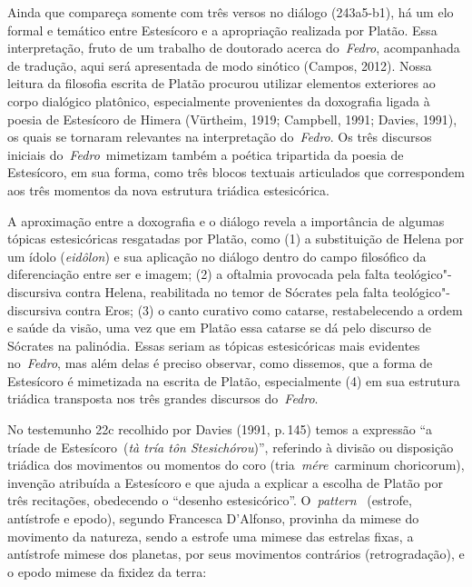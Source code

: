  

Ainda que compareça somente com três versos no diálogo (243a5-b1), há um
elo formal e temático entre Estesícoro e a apropriação realizada por
Platão. Essa interpretação, fruto de um trabalho de doutorado acerca
do~\emph{Fedro}, acompanhada de tradução, aqui será apresentada de modo
sinótico (Campos, 2012). Nossa leitura da filosofia escrita de Platão
procurou utilizar elementos exteriores ao corpo dialógico platônico,
especialmente provenientes da doxografia ligada à poesia de Estesícoro
de Himera (Vürtheim, 1919; Campbell, 1991; Davies, 1991), os quais se
tornaram relevantes na interpretação do~\emph{Fedro}. Os três discursos
iniciais do~\emph{Fedro}~mimetizam também a poética tripartida da poesia
de Estesícoro, em sua forma, como três blocos textuais articulados que
correspondem aos três momentos da nova estrutura triádica estesicórica.

A aproximação entre a doxografia e o diálogo revela a importância de
algumas tópicas estesicóricas resgatadas por Platão, como (1) a
substituição de Helena por um ídolo (\emph{eidôlon}) e sua aplicação no
diálogo dentro do campo filosófico da diferenciação entre ser e imagem; 
(2) a oftalmia provocada pela falta teológico"-discursiva contra Helena,
reabilitada no temor de Sócrates pela falta teológico"-discursiva contra
Eros; (3) o canto curativo como catarse, restabelecendo a ordem e saúde
da visão, uma vez que em Platão essa catarse se dá pelo discurso de
Sócrates na palinódia. Essas seriam as tópicas estesicóricas mais
evidentes no~\emph{Fedro}, mas além delas é preciso observar, como
dissemos, que a forma de Estesícoro é mimetizada na escrita de Platão,
especialmente (4) em sua estrutura triádica transposta nos três grandes
discursos do~\emph{Fedro}.

No testemunho 22c recolhido por Davies (1991, p.\,145) temos a expressão
``a tríade de Estesícoro~(\emph{tà tría tôn Stesichórou})'',
referindo à divisão ou disposição triádica dos movimentos ou momentos do
coro (tria~\emph{mére}~carminum choricorum), invenção atribuída a
Estesícoro e que ajuda a explicar a escolha de Platão por três recitações,
obedecendo o ``desenho estesicórico''. O~\emph{pattern}~ (estrofe,
antístrofe e epodo), segundo Francesca D'Alfonso, provinha da mimese do
movimento da natureza, sendo a estrofe uma mimese das estrelas fixas, a
antístrofe mimese dos planetas, por seus movimentos contrários
(retrogradação), e o epodo mimese da fixidez da terra:

 

